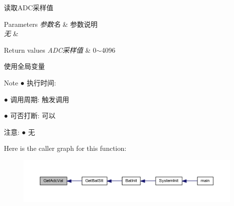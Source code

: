 读取\-A\-D\-C采样值 


\begin{DoxyParams}{\-Parameters}
{\em 参数名} & 参数说明 \\
\hline
{\em 无} & \\
\hline
\end{DoxyParams}

\begin{DoxyRetVals}{\-Return values}
{\em \-A\-D\-C采样值} & 0$\sim$4096 \\
\hline
\end{DoxyRetVals}
\begin{DoxyParagraph}{使用全局变量 }

\end{DoxyParagraph}
\begin{DoxyNote}{\-Note}
● 执行时间\-: \par
 ● 调用周期\-: 触发调用 \par
 ● 可否打断\-: 可以 \par

\end{DoxyNote}
\begin{DoxyParagraph}{注意\-:}
● 无 \par
 
\end{DoxyParagraph}


\-Here is the caller graph for this function\-:\nopagebreak
\begin{figure}[H]
\begin{center}
\leavevmode
\includegraphics[width=350pt]{group___a_d_c_gacb456636a61c9e02bc860319fa06f64e_icgraph}
\end{center}
\end{figure}


